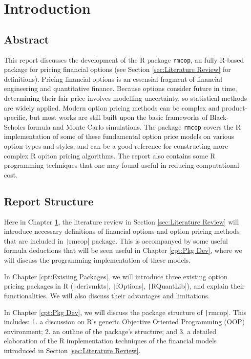 \chapter{Introduction} \label{cpt:Introduction}

\section{Abstract}

This report discusses the development of the R package \texttt{rmcop}, an fully R-based package for pricing financial options (see Section \ref{sec:Literature Review} for definitions). Pricing financial options is an essensial fragment of financial engineering and quantitative finance. Because options consider future in time, determining their fair price involves modelling uncertainty, so statistical methods are widely applied. Modern option pricing methods can be complex and product-specific, but most works are still built upon the basic frameworks of Black-Scholes formula and Monte Carlo simulations. The package \texttt{rmcop} covers the R implementation of some of these fundamental option price models on various option types and styles, and can be a good reference for constructing more complex R opiton pricing algorithms. The report also contains some R programming techniques that one may found useful in reducing computational cost.

\section{Report Structure}

Here in Chapter \ref{cpt:Introduction}, the literature review in Section \ref{sec:Literature Review} will introduce necessary definitions of financial options and option pricing methods that are included in \texttt|rmcop| package. This is accompanyed by some useful formula deductions that will be seen useful in Chapter \ref{cpt:Pkg Dev}, where we will discuss the programming implementation of these models.

In Chapter \ref{cpt:Existing Packages}, we will introduce three existing option pricing packages in R (\texttt|derivmkts|, \texttt|fOptions|, \texttt|RQuantLib|), and explain their functionalities. We will also discuss their advantages and limitations.

In Chapter \ref{cpt:Pkg Dev}, we will discuss the package structure of \texttt|rmcop|. This includes: 1. a discussion on R's generic Objective Oriented Programming (OOP) environment; 2. an outline of the package's structure; and 3. a detailed elaboration of the R implementation techniques of the financial models introduced in Section \ref{sec:Literature Review}.

